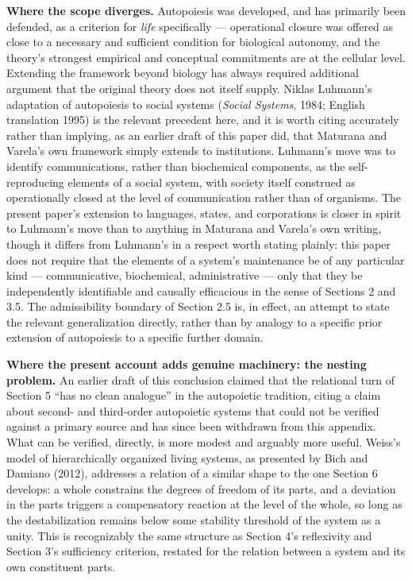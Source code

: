 \documentclass[11pt]{article}
\theoremstyle{plain}
\begin{document}
\textbf{Where the scope diverges.} Autopoiesis was developed, and has primarily been defended, as a criterion for \emph{life} specifically --- operational closure was offered as close to a necessary and sufficient condition for biological autonomy, and the theory's strongest empirical and conceptual commitments are at the cellular level. Extending the framework beyond biology has always required additional argument that the original theory does not itself supply. Niklas Luhmann's adaptation of autopoiesis to social systems (\emph{Social Systems}, 1984; English translation 1995) is the relevant precedent here, and it is worth citing accurately rather than implying, as an earlier draft of this paper did, that Maturana and Varela's own framework simply extends to institutions. Luhmann's move was to identify communications, rather than biochemical components, as the self-reproducing elements of a social system, with society itself construed as operationally closed at the level of communication rather than of organisms. The present paper's extension to languages, states, and corporations is closer in spirit to Luhmann's move than to anything in Maturana and Varela's own writing, though it differs from Luhmann's in a respect worth stating plainly: this paper does not require that the elements of a system's maintenance be of any particular kind --- communicative, biochemical, administrative --- only that they be independently identifiable and causally efficacious in the sense of Sections 2 and 3.5. The admissibility boundary of Section 2.5 is, in effect, an attempt to state the relevant generalization directly, rather than by analogy to a specific prior extension of autopoiesis to a specific further domain.

\textbf{Where the present account adds genuine machinery: the nesting problem.} An earlier draft of this conclusion claimed that the relational turn of Section 5 ``has no clean analogue'' in the autopoietic tradition, citing a claim about second- and third-order autopoietic systems that could not be verified against a primary source and has since been withdrawn from this appendix. What can be verified, directly, is more modest and arguably more useful. Weiss's model of hierarchically organized living systems, as presented by Bich and Damiano (2012), addresses a relation of a similar shape to the one Section 6 develops: a whole constrains the degrees of freedom of its parts, and a deviation in the parts triggers a compensatory reaction at the level of the whole, so long as the destabilization remains below some stability threshold of the system as a unity. This is recognizably the same structure as Section 4's reflexivity and Section 3's sufficiency criterion, restated for the relation between a system and its own constituent parts.
\end{document}
